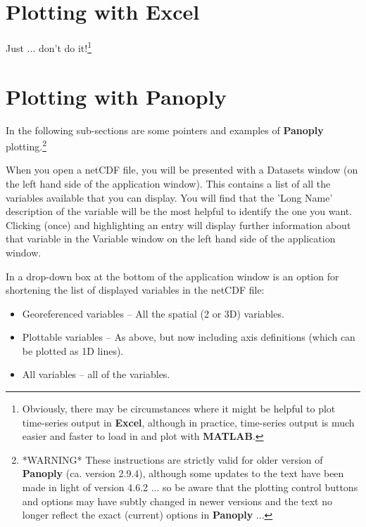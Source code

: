 \documentclass[11pt,fleqn]{book} %
\begin{document}

\newpage


\section{Plotting with Excel}

Just ... don't do it!\footnote{Obviously, there may be circumstances where it might be helpful to plot time-series output in \textbf{Excel}, although in practice, time-series output is much easier and faster to load in and plot with \textbf{MATLAB}.}


\newpage


\section{Plotting with Panoply}

In the following sub-sections are some pointers and examples of \textbf{Panoply} plotting.\footnote{*WARNING* These instructions are strictly valid for older version of \textbf{Panoply} (ca. version 2.9.4), although some updates to the text have been made in light of version 4.6.2 ... so be aware that the plotting control buttons and options may have subtly changed in newer versions and the text no longer reflect the exact (current) options in \textbf{Panoply} ...}

When you open a netCDF file, you will be presented with a \footnotesize\textsf{Datasets }\normalsize window (on the left hand side of the application window). This contains a list of all the variables available that you can display. You will find that the 'Long Name' description of the variable will be the most helpful to identify the one you want. Clicking (once) and highlighting an entry will display further information about that variable in the \footnotesize\textsf{Variable }\normalsize window on the left hand side of the application window.

In a drop-down box at the bottom of the application window is an option for shortening the list of displayed variables in the netCDF file:

\begin{itemize}[noitemsep]
\vspace{1mm}
\item \footnotesize\textsf{Georeferenced variables }\normalsize -- All the spatial (2 or 3D) variables.
\vspace{1mm}
\item \footnotesize\textsf{Plottable variables }\normalsize -- As above, but now including axis definitions (which can be plotted as 1D lines).
\vspace{1mm}
\item \footnotesize\textsf{All variables }\normalsize -- all of the variables.
\end{itemize}
\vspace{2mm}
\end{document}

